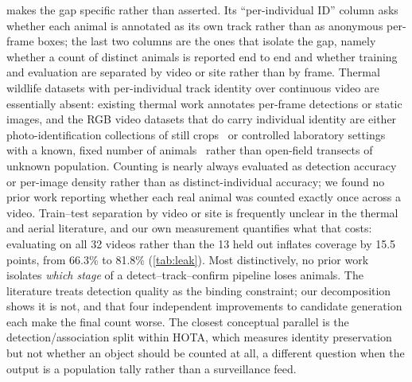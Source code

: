  makes the gap specific rather than asserted. Its ``per-individual ID''
column asks whether each animal is annotated as its own track rather than as anonymous
per-frame boxes; the last two columns are
the ones that isolate the gap, namely whether a count of distinct animals is reported end to
end and whether training and evaluation are separated by video or site rather than by frame. Thermal wildlife datasets with
per-individual track identity over continuous video are essentially absent: existing thermal
work annotates per-frame detections or static images, and the RGB video datasets that do carry
individual identity are either photo-identification collections of still
crops~\cite{adam2025wildlifereid10k} or controlled laboratory settings with a known, fixed
number of animals~\cite{dolokov2023upper} rather than open-field transects of unknown
population. Counting is nearly always evaluated as detection accuracy or per-image density
rather than as distinct-individual accuracy; we found no prior work reporting whether each real
animal was counted exactly once across a video. Train--test separation by video or site is
frequently unclear in the thermal and aerial literature, and our own measurement quantifies what that costs: evaluating on all 32 videos rather than the 13 held out inflates coverage
by 15.5 points, from 66.3\% to 81.8\% (\cref{tab:leak}). Most distinctively, no prior work
isolates \emph{which stage} of a detect--track--confirm pipeline loses animals. The literature
treats detection quality as the binding constraint; our decomposition shows it is not, and that
four independent improvements to candidate generation each make the final count worse. The
closest conceptual parallel is the detection/association split within HOTA, which measures
identity preservation but not whether an object should be counted at all, a different
question when the output is a population tally rather than a surveillance feed.
